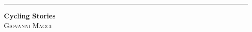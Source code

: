 \documentclass[a4paper,10pt,headinclude,footinclude,titlepage]{book} %
\begin{document}

\begin{titlepage} %
	
	\raggedleft %
	
	\rule{1pt}{\textheight} %
	\hspace{0.05\textwidth} %
	\parbox[b]{0.75\textwidth}{ %
		
		{\Huge\bfseries Cycling Stories}\\[2\baselineskip] %
		{\Large\textsc{Giovanni Maggi}} %
		
		\vspace{0.5\textheight} %
		
	}

\end{titlepage}

\cleardoublepage



\tableofcontents





\cleardoublepage

\end{document}
